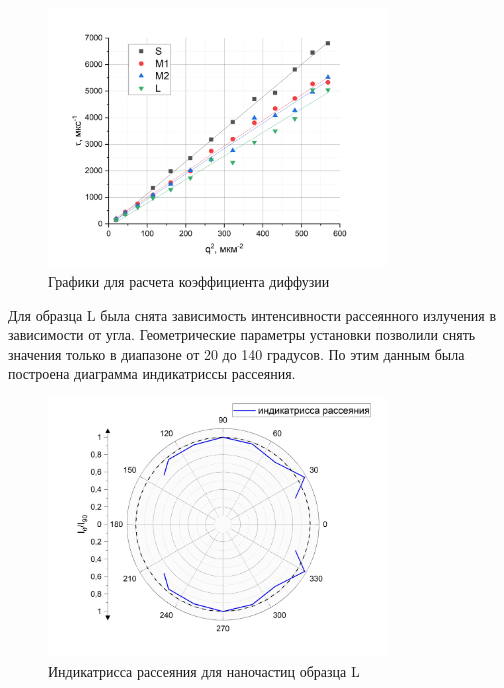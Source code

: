 \documentclass[a4paper,12pt]{article} %
\begin{document}
\begin{figure}[h!]
\begin{center}
\includegraphics[width=0.8\textwidth]{D.png}
\caption{Графики для расчета коэффициента диффузии}
\end{center}
\end{figure}

Для образца L была снята зависимость интенсивности рассеянного излучения в зависимости от угла. Геометрические параметры установки позволили снять значения только в диапазоне от 20 до 140 градусов. По этим данным была построена диаграмма индикатриссы рассеяния.

\begin{figure}[h]
\begin{center}
\includegraphics[width=0.8\textwidth]{x11jeDUvqWk.jpg}
\caption{Индикатрисса рассеяния для наночастиц образца L} %
\end{center}
\end{figure}
\end{document}
